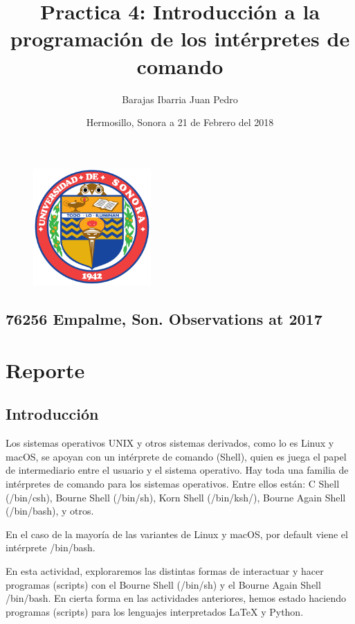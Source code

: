 \documentclass[12pt,letterpaper]{article}
\begin{document}
     	\begin{figure}
        \centering
        \includegraphics[width=0.4\textwidth]{escudo}
        \end{figure}
    	\title{Practica 4: Introducción a la programación de los intérpretes de comando} 
        \author{Barajas Ibarria Juan Pedro}
        \date{Hermosillo, Sonora a 21 de Febrero del 2018}
    \maketitle
    	\begin{center}
	\section*{76256 Empalme, Son. Observations at 2017}
    	\end{center}
    \section{Reporte}
         \subsection{Introducción}
          Los sistemas operativos UNIX y otros sistemas derivados, como lo es Linux y macOS, se apoyan con un intérprete de comando (Shell), quien es juega el papel de intermediario entre el usuario y el sistema operativo.
      Hay toda una familia de intérpretes de comando para los sistemas operativos. Entre ellos están:  C Shell (/bin/csh), Bourne Shell (/bin/sh), Korn Shell (/bin/ksh/), Bourne Again Shell (/bin/bash), y otros. \par
      En el caso de la mayoría de las variantes de Linux y macOS, por default viene el intérprete /bin/bash.\par
      En esta actividad, exploraremos las distintas formas de interactuar y hacer programas (scripts) con el Bourne Shell (/bin/sh) y el Bourne Again Shell /bin/bash. En cierta forma en las actividades anteriores, hemos estado haciendo programas (scripts) para los lenguajes interpretados LaTeX y Python.
\end{document}
